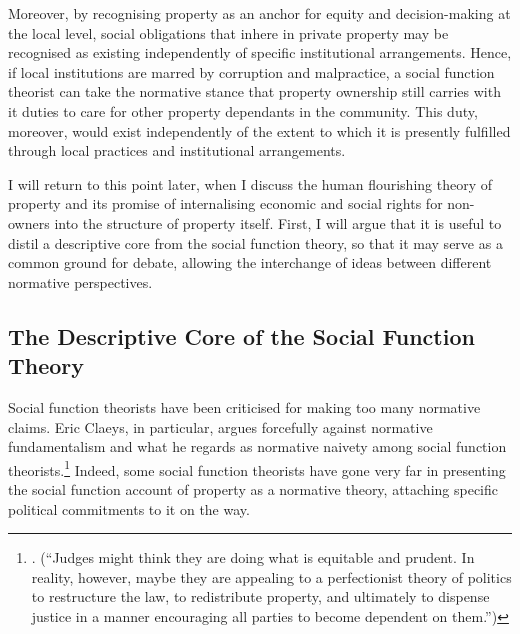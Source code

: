 Moreover, by recognising property as an anchor for equity and decision-making at the local level, social obligations that inhere in private property may be recognised as existing independently of specific institutional arrangements. Hence, if local institutions are marred by corruption and malpractice, a social function theorist can take the normative stance that property ownership still carries with it duties to care for other property dependants in the community. This duty, moreover, would exist independently of the extent to which it is presently fulfilled through local practices and institutional arrangements. 

I will return to this point later, when I discuss the human flourishing theory of property and its promise of internalising economic and social rights for non-owners into the structure of property itself. First, I will argue that it is useful to distil a descriptive core from the social function theory, so that it may serve as a common ground for debate, allowing the interchange of ideas between different normative perspectives. 

\subsection{The Descriptive Core of the Social Function Theory}

Social function theorists have been criticised for making too many normative claims. Eric Claeys, in particular, argues forcefully against normative fundamentalism and what he regards as normative naivety among social function theorists.\footnote{\cite[945]{claeys09}. (``Judges might think they are doing what is equitable and prudent. In reality, however, maybe they are appealing to a perfectionist theory of politics to restructure the law, to redistribute property, and ultimately to dispense justice in a manner encouraging all parties to become dependent on them.'')} Indeed, some social function theorists have gone very far in presenting the social function account of property as a normative theory, attaching specific political commitments to it on the way.

